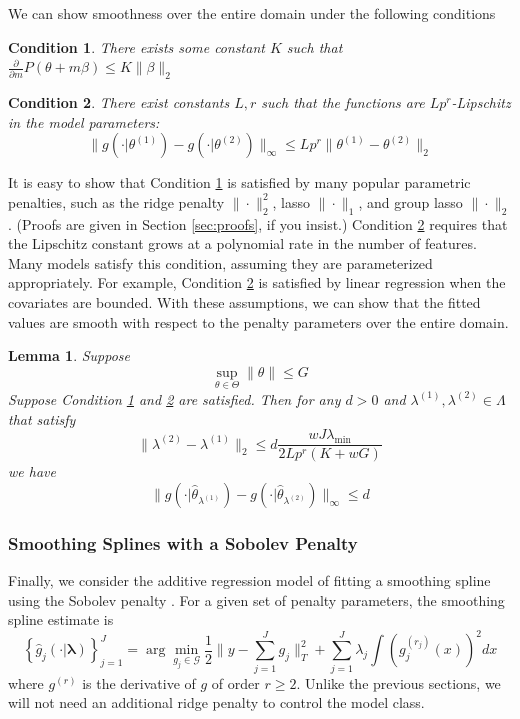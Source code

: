 \documentclass[12pt]{article}
\newtheorem{lemma}{Lemma}
\newtheorem{condition}{Condition}
\begin{document}
We can show smoothness over the entire domain under the following conditions
\begin{condition}
\label{condn:param1}
There exists some constant $K$ such that
$\frac{\partial}{\partial m}P(\theta + m \beta) \le K \|\beta\|_{2}$
\end{condition}
\begin{condition}
\label{condn:param2}
There exist constants $L, r$ such that the functions are $Lp^r$-Lipschitz in the model parameters:
\begin{equation}
\|g(\cdot|\theta^{(1)})-g(\cdot|\theta^{(2)})\|_{\infty}\le Lp^{r}\|\theta^{(1)}-\theta^{(2)}\|_{2}
\end{equation}
\end{condition}

It is easy to show that Condition \ref{condn:param1} is satisfied by many popular parametric penalties, such as the ridge penalty $\| \cdot \|_2^2$, lasso $\| \cdot \|_1$, and group lasso $\| \cdot \|_2$. (Proofs are given in Section \ref{sec:proofs}, if you insist.) Condition \ref{condn:param2} requires that the Lipschitz constant grows at a polynomial rate in the number of features. Many models satisfy this condition, assuming they are parameterized appropriately. For example, Condition \ref{condn:param2} is satisfied by linear regression when the covariates are bounded. With these assumptions, we can show that the fitted values are smooth with respect to the penalty parameters over the entire domain.

\begin{lemma}
\label{lemma:parametric}
Suppose
\[
\sup_{\theta\in\Theta}\|\theta\|\le G
\]
Suppose Condition \ref{condn:param1} and \ref{condn:param2} are satisfied.
Then for any $d>0$ and $\lambda^{(1)}, \lambda^{(2)} \in \Lambda$ that satisfy
\[
\|\lambda^{(2)}-\lambda^{(1)}\|_{2}\le d\frac{wJ\lambda_{\min}}{2Lp^{r}\left(K+wG\right)}
\]
we have
\[
\|g(\cdot|\hat{\theta}_{\lambda^{(1)}})-g(\cdot|\hat{\theta}_{\lambda^{(2)}})\|_{\infty}\le d
\]
\end{lemma}

\subsubsection{Smoothing Splines with a Sobolev Penalty}

Finally, we consider the additive regression model of fitting a smoothing spline using the Sobolev penalty \citep{de1978practical, wahba1990spline, green1994nonparametric}. For a given set of penalty parameters, the smoothing spline estimate is
\begin{equation}
\left \{ \hat{g}_j(\cdot | \boldsymbol \lambda) \right \}_{j=1}^J =\arg\min_{g_j\in\mathcal{G}}\frac{1}{2}\|y- \sum_{j=1}^J g_j\|_{T}^{2}+ \sum_{j=1}^J \lambda_j \int (g_j^{(r_j)}(x))^2 dx
\end{equation}
where $g^{(r)}$ is the derivative of $g$ of order $r \ge 2$. Unlike the previous sections, we will not need an additional ridge penalty to control the model class.
\end{document}
